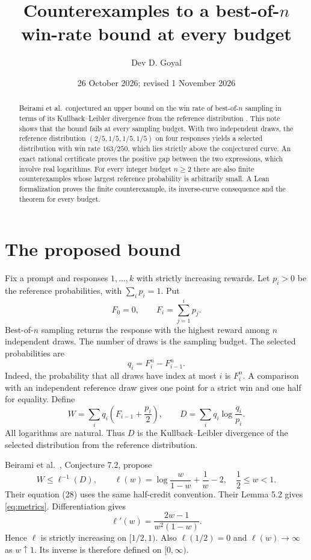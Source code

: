 \documentclass[11pt,a4paper]{article}
\title{Counterexamples to a best-of-$n$ win-rate bound at every budget}
\author{Dev D. Goyal}
\date{26 October 2026; revised 1 November 2026}
\begin{document}
\maketitle
\begin{abstract}
Beirami et al.\ conjectured an upper bound on the win rate of best-of-$n$ sampling in terms of its Kullback--Leibler divergence from the reference distribution \cite[Conjecture~7.2]{beirami}. This note shows that the bound fails at every sampling budget. With two independent draws, the reference distribution $(2/5,1/5,1/5,1/5)$ on four responses yields a selected distribution with win rate $163/250$, which lies strictly above the conjectured curve. An exact rational certificate proves the positive gap between the two expressions, which involve real logarithms. For every integer budget $n\geq2$ there are also finite counterexamples whose largest reference probability is arbitrarily small. A Lean formalization proves the finite counterexample, its inverse-curve consequence and the theorem for every budget.
\end{abstract}

\section{The proposed bound}\label{sec:bound}
Fix a prompt and responses $1,\ldots,k$ with strictly increasing rewards. Let $p_i>0$ be the reference probabilities, with $\sum_i p_i=1$. Put
\[
 F_0=0,\qquad F_i=\sum_{j=1}^i p_j.
\]
Best-of-$n$ sampling returns the response with the highest reward among $n$ independent draws. The number of draws is the sampling budget. The selected probabilities are
\begin{equation}\label{eq:q}
 q_i=F_i^n-F_{i-1}^n.
\end{equation}
Indeed, the probability that all draws have index at most $i$ is $F_i^n$.
A comparison with an independent reference draw gives one point for a strict win and one half for equality. Define
\begin{equation}\label{eq:metrics}
 W=\sum_i q_i\left(F_{i-1}+\frac{p_i}{2}\right),
 \qquad D=\sum_i q_i\log\frac{q_i}{p_i}.
\end{equation}
All logarithms are natural. Thus $D$ is the Kullback--Leibler divergence of the selected distribution from the reference distribution.

Beirami et al.\ \cite{beirami}, Conjecture 7.2, propose
\begin{equation}\label{eq:conjecture}
 W\leq \ell^{-1}(D),\qquad
 \ell(w)=\log\frac{w}{1-w}+\frac1w-2,
 \quad \frac12\leq w<1.
\end{equation}
Their equation (28) uses the same half-credit convention. Their Lemma 5.2 gives \eqref{eq:metrics}.
Differentiation gives
\[
 \ell'(w)=\frac{2w-1}{w^2(1-w)}.
\]
Hence $\ell$ is strictly increasing on $[1/2,1)$. Also $\ell(1/2)=0$ and $\ell(w)\to\infty$ as $w\uparrow1$. Its inverse is therefore defined on $[0,\infty)$.
\end{document}
